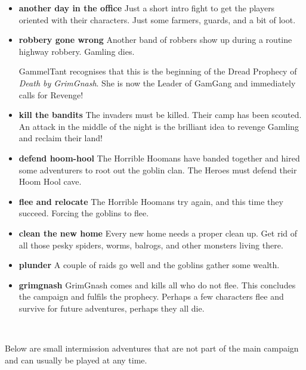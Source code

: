 \begin{itemize}

    \item \textbf{another day in the office} Just a short intro fight to get the players oriented with their characters. Just some farmers, guards, and a bit of loot.

    \item \textbf{robbery gone wrong} Another band of robbers show up during a routine highway robbery. Gamling dies.

    GammelTant recognises that this is the beginning of the Dread Prophecy of \emph{Death by GrimGnash}. She is now the Leader of GamGang and immediately calls for Revenge!

    \item \textbf{kill the bandits} The invaders must be killed. Their camp has been scouted. An attack in the middle of the night is the brilliant idea to revenge Gamling and reclaim their land!

    \item \textbf{defend hoom-hool} The Horrible Hoomans have banded together and hired some adventurers to root out the goblin clan. The Heroes must defend their Hoom Hool cave.

    \item \textbf{flee and relocate} The Horrible Hoomans try again, and this time they succeed. Forcing the goblins to flee.

    \item \textbf{clean the new home} Every new home needs a proper clean up. Get rid of all those pesky spiders, worms, balrogs, and other monsters living there.

    \item \textbf{plunder} A couple of raids go well and the goblins gather some wealth.

    \item \textbf{grimgnash} GrimGnash comes and kills all who do not flee. This concludes the campaign and fulfils the prophecy. Perhaps a few characters flee and survive for future adventures, perhaps they all die.

\end{itemize}

\

Below are small intermission adventures that are not part of the main campaign and can usually be played at any time.

